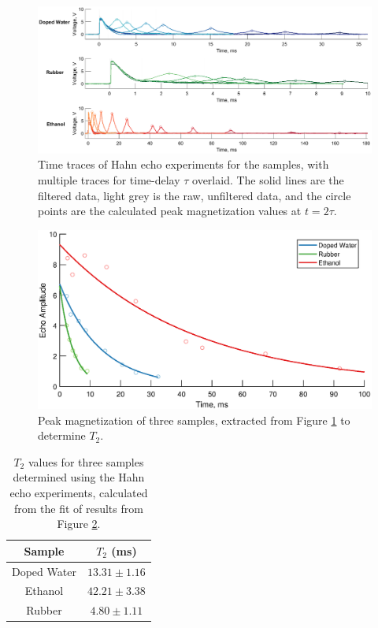 \begin{figure}[H]
    \centering
    \includegraphics[width=\textwidth]{figures/B5/B5_1.eps}
    \caption{Time traces of Hahn echo experiments for the samples, with multiple traces for time-delay $\tau$ overlaid. The solid lines are the filtered data, light grey is the raw, unfiltered data, and the circle points are the calculated peak magnetization values at $t=2\tau$.}
    \label{fig:B5:fit/trace}
\end{figure}

\begin{figure}[H]
    \centering
    \includegraphics[width=\textwidth]{figures/B5/B5_2.eps}
    \caption{Peak magnetization of three samples, extracted from Figure \ref{fig:B5:fit/trace} to determine $T_2$.}
    \label{fig:B5:expcurve}
\end{figure}

\begin{table}[H]
    \centering
    \begin{tabular}{c|c}
    \toprule
    \textbf{Sample} & $T_2$ (ms) \\ \midrule
        Doped Water &  $13.31 \pm 1.16$ \\
        Ethanol &  $42.21 \pm 3.38$ \\
        Rubber &  $4.80 \pm 1.11$ \\ \bottomrule
    \end{tabular}
    \caption{$T_2$ values for three samples determined using the Hahn echo experiments, calculated from the fit of results from Figure \ref{fig:B5:expcurve}.}
    \label{tab:B5:T2vals}
\end{table}

